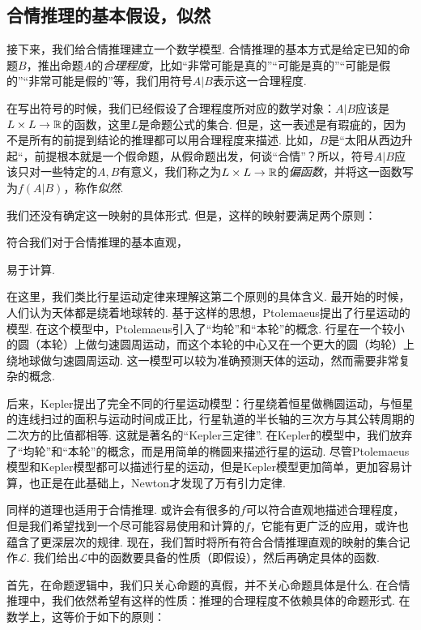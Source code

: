 \subsection{合情推理的基本假设，似然}

接下来，我们给合情推理建立一个数学模型. 合情推理的基本方式是给定已知的命题$B$，推出命题$A$的\textit{合理程度}，比如“非常可能是真的”“可能是真的”“可能是假的”“非常可能是假的”等，我们用符号$A|B$表示这一合理程度. 

在写出符号的时候，我们已经假设了合理程度所对应的数学对象：$A|B$应该是$L\times L\to\mathbb{R}$的函数，这里$L$是命题公式的集合. 但是，这一表述是有瑕疵的，因为不是所有的前提到结论的推理都可以用合理程度来描述. 比如，$B$是“太阳从西边升起“，前提根本就是一个假命题，从假命题出发，何谈“合情”？所以，符号$A|B$应该只对一些特定的$A,B$有意义，我们称之为$L\times L\to\mathbb{R}$的\textit{偏函数}，并将这一函数写为$f(A|B)$，称作\textit{似然}.

我们还没有确定这一映射的具体形式. 但是，这样的映射要满足两个原则：
\begin{enumerate*}
    \item 符合我们对于合情推理的基本直观，
    \item 易于计算.
\end{enumerate*}

在这里，我们类比行星运动定律来理解这第二个原则的具体含义. 最开始的时候，人们认为天体都是绕着地球转的. 基于这样的思想，Ptolemaeus提出了行星运动的模型. 在这个模型中，Ptolemaeus引入了“均轮”和“本轮”的概念. 行星在一个较小的圆（本轮）上做匀速圆周运动，而这个本轮的中心又在一个更大的圆（均轮）上绕地球做匀速圆周运动. 这一模型可以较为准确预测天体的运动，然而需要非常复杂的概念. 

后来，Kepler提出了完全不同的行星运动模型：行星绕着恒星做椭圆运动，与恒星的连线扫过的面积与运动时间成正比，行星轨道的半长轴的三次方与其公转周期的二次方的比值都相等. 这就是著名的“Kepler三定律”. 在Kepler的模型中，我们放弃了“均轮”和“本轮”的概念，而是用简单的椭圆来描述行星的运动. 尽管Ptolemaeus模型和Kepler模型都可以描述行星的运动，但是Kepler模型更加简单，更加容易计算，也正是在此基础上，Newton才发现了万有引力定律. 

同样的道理也适用于合情推理. 或许会有很多的$f$可以符合直观地描述合理程度，但是我们希望找到一个尽可能容易使用和计算的$f$，它能有更广泛的应用，或许也蕴含了更深层次的规律. 现在，我们暂时将所有符合合情推理直观的映射的集合记作$\mathcal L$. 我们给出$\mathcal L$中的函数要具备的性质（即假设），然后再确定具体的函数. 

首先，在命题逻辑中，我们只关心命题的真假，并不关心命题具体是什么. 在合情推理中，我们依然希望有这样的性质：推理的合理程度不依赖具体的命题形式. 在数学上，这等价于如下的原则：

